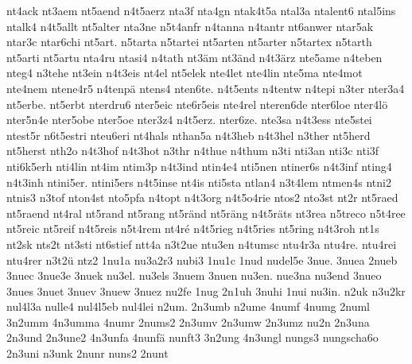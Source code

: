 {    nt4ack
    nt3aem
    nt5aend
    n4t5aerz
    nta3f
    nta4gn
    ntak4t5a
    ntal3a
    ntalent6
    ntal5ins
    ntalk4
    n4t5allt
    nt5alter
    nta3ne
    n5t4anfr
    n4tanna
    n4tantr
    nt6anwer
    ntar5ak
    ntar3c
    ntar6chi
    nt5art.
    n5tarta
    n5tartei
    nt5arten
    nt5arter
    n5tartex
    n5tarth
    nt5arti
    nt5artu
    nta4ru
    ntasi4
    n4tath
    nt3äm
    nt3änd
    n4t3ärz
    nte5ame
    n4teben
    nteg4
    n3tehe
    nt3ein
    n4t3eis
    nt4el
    nt5elek
    nte4let
    nte4lin
    nte5ma
    nte4mot
    nte4nem
    ntene4r5
    n4tenpä
    ntens4
    nten6te.
    n4t5ents
    n4tentw
    n4tepi
    n3ter
    nter3a4
    nt5erbe.
    nt5erbt
    nterdru6
    nter5eic
    nte6r5eis
    nte4rel
    nteren6de
    nter6loe
    nter4lö
    nter5n4e
    nter5obe
    nter5oe
    nter3z4
    n4t5erz.
    nter6ze.
    nte3sa
    n4t3ess
    nte5stei
    ntest5r
    n6t5estri
    nteu6eri
    nt4hals
    nthan5a
    n4t3heb
    n4t3hel
    n3ther
    nt5herd
    nt5herst
    nth2o
    n4t3hof
    n4t3hot
    n3thr
    n4thue
    n4thum
    n3ti
    nti3an
    nti3c
    nti3f
    nti6k5erh
    nti4lin
    nt4im
    ntim3p
    n4t3ind
    ntin4e4
    nti5nen
    ntiner6s
    n4t3inf
    nting4
    n4t3inh
    ntini5er.
    ntini5ers
    n4t5inse
    nt4is
    nti5sta
    ntlan4
    n3t4lem
    ntmen4s
    ntni2
    ntnis3
    n3tof
    nton4st
    nto5pfa
    n4topt
    n4t3org
    n4t5o4rie
    ntos2
    nto3st
    nt2r
    nt5raed
    nt5raend
    nt4ral
    nt5rand
    nt5rang
    nt5ränd
    nt5räng
    n4t5räts
    nt3rea
    n5treco
    n5t4ree
    nt5reic
    nt5reif
    n4t5reis
    n5t4rem
    nt4ré
    n4t5rieg
    n4t5ries
    nt5ring
    n4t3roh
    nt1s
    nt2sk
    nts2t
    nt3sti
    nt6stief
    ntt4a
    n3t2ue
    ntu3en
    n4tumsc
    ntu4r3a
    ntu4re.
    ntu4rei
    ntu4rer
    n3t2ü
    ntz2
    1nu1a
    nu3a2r3
    nubi3
    1nu1c
    1nud
    nudel5e
    3nue.
    3nuea
    2nueb
    3nuec
    3nue3e
    3nuek
    nu3el.
    nu3els
    3nuem
    3nuen
    nu3en.
    nue3na
    nu3end
    3nueo
    3nues
    3nuet
    3nuev
    3nuew
    3nuez
    nu2fe
    1nug
    2n1uh
    3nuhi
    1nui
    nu3in.
    n2uk
    n3u2kr
    nul4l3a
    nulle4
    nul4l5eb
    nul4lei
    n2um.
    2n3umb
    n2ume
    4numf
    4numg
    2numl
    3n2umm
    4n3umma
    4numr
    2nums2
    2n3umv
    2n3umw
    2n3umz
    nu2n
    2n3una
    2n3und
    2n3une2
    4n3unfa
    4nunfä
    nunft3
    3n2ung
    4n3ungl
    nungs3
    nungscha6o
    2n3uni
    n3unk
    2nunr
    nuns2
    2nunt
}

